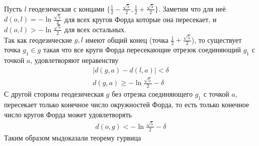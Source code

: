 		Пусть $l$ геодезическая с концами $\{\frac{1}{2} - \frac{\sqrt{5}}{2}, \frac{1}{2} + \frac{\sqrt{5}}{2}\}$. Заметим что для неё $d(o,l) = -\ln\frac{\sqrt{5}}{2}$ для всех кругов Форда которые она пересекает, и $d(o,l) > -\ln\frac{\sqrt{5}}{2}$ для всех остальных.\\
		Так как геодезические $g,l$ имеют общий конец (точка $\frac{1}{2} + \frac{\sqrt{5}}{2}$), то существует точка $g_1 \in g$ такая что все круги Форда пересекающие отрезок соединяющий $g_1$ с точкой $a$, удовлетворяют неравенству
		\begin{gather*}
			|d(g,a) - d(l,a)| < \delta\\
			d(g,a) \geqslant -\ln\frac{\sqrt{5}}{2} - \delta
		\end{gather*}
		С другой стороны геодезическая $g$ без отрезка соединяющего $g_1$ с точкой $a$, пересекает только конечное число окружностей Форда, то есть только конечное число кругов Форда может удовлетворять 
		\begin{gather*}
			d(o,g) < -\ln\frac{\sqrt{5}}{2} - \delta
		\end{gather*}
		Таким образом мыдоказали теорему гурвица